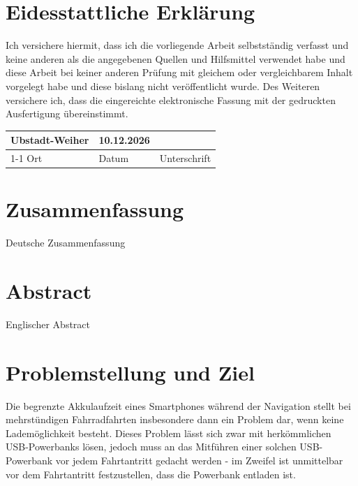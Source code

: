 \documentclass[12pt,a4paper]{article}
\begin{document}
\newpage
{}
\setcounter{page}{1}

\section*{Eidesstattliche Erklärung}
Ich versichere hiermit, dass ich die vorliegende Arbeit selbstständig verfasst und keine anderen als die angegebenen Quellen und Hilfsmittel verwendet habe und diese Arbeit bei keiner anderen Prüfung mit gleichem oder vergleichbarem Inhalt vorgelegt habe und diese bislang nicht veröffentlicht wurde. Des Weiteren versichere ich, dass die eingereichte elektronische Fassung mit der gedruckten Ausfertigung übereinstimmt.

\vspace{1.5cm}
\begin{tabular}{@{}p{3.5cm}p{4.0cm}p{5.5cm}@{}}
    Ubstadt-Weiher & 10.12.2026 & \\ \cline{1-1} \cline{2-2} \cline{3-3}
    Ort & Datum & Unterschrift
\end{tabular}

\vspace{2.0cm}

\newpage
\section*{Zusammenfassung}
Deutsche Zusammenfassung 

\newpage
\section*{Abstract}
Englischer Abstract

\newpage
\tableofcontents

\newpage
\listoffigures

\newpage
\listoftables

\newpage
{}
\setcounter{page}{1}

\section{Problemstellung und Ziel}
Die begrenzte Akkulaufzeit eines Smartphones während der Navigation stellt bei mehrstündigen
Fahrradfahrten insbesondere dann ein Problem dar, wenn keine Lademöglichkeit besteht. 
Dieses Problem lässt sich zwar mit herkömmlichen USB-Powerbanks lösen, jedoch muss an das 
Mitführen einer solchen USB-Powerbank vor jedem Fahrtantritt gedacht werden - im Zweifel 
ist unmittelbar vor dem Fahrtantritt festzustellen, dass die Powerbank entladen ist.
\end{document}
